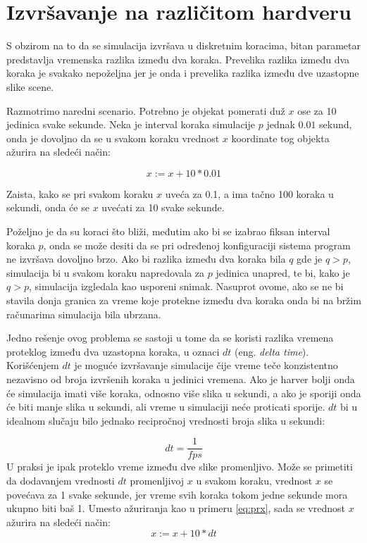 \documentclass[12pt,oneside]{memoir}
\newtheorem{primer}{Primer}[section]
\begin{document}
\section{Izvršavanje na različitom hardveru}

S obzirom na to da se simulacija izvršava u diskretnim koracima,
bitan parametar predstavlja vremenska razlika između dva koraka.
Prevelika razlika između dva koraka je svakako nepoželjna jer je onda i prevelika razlika između dve uzastopne slike scene.

Razmotrimo naredni scenario. Potrebno je objekat pomerati duž $x$ ose za 10 jedinica svake sekunde. Neka je interval koraka simulacije 
$p$ jednak $0.01$ sekund, onda je dovoljno da se u svakom koraku vrednost $x$ koordinate tog objekta ažurira na sledeći način:


\begin{equation}
	x:= x + 10 * 0.01
	\label{eq:prx}
\end{equation}

Zaista, kako se pri svakom koraku $x$ uveća za 0.1, a ima tačno 100 koraka u sekundi, onda će se $x$ uvećati za 10 svake sekunde.

Poželjno je da su koraci što bliži, međutim ako bi se izabrao fiksan interval koraka $p$, onda se može desiti
da se pri određenoj konfiguraciji sistema program ne izvršava dovoljno brzo. 
Ako bi razlika između dva koraka bila $q$ gde je $q > p$, 
simulacija bi u svakom koraku napredovala za $p$ jedinica unapred, te bi,
kako je $q > p$, simulacija izgledala kao usporeni snimak.
Nasuprot ovome, ako se ne bi stavila donja granica za vreme koje protekne između dva koraka onda bi na bržim računarima
simulacija bila ubrzana. 

Jedno rešenje ovog problema se sastoji u tome da se koristi 
razlika vremena proteklog između dva uzastopna koraka, u oznaci $dt$ (eng. {\em delta time}).
Korišćenjem $dt$ je moguće izvršavanje simulacije čije vreme teče konzistentno nezavisno od broja izvršenih koraka u 
jedinici vremena. Ako je harver bolji onda će simulacija imati više koraka, odnosno više slika u sekundi, a ako je 
sporiji onda će biti manje slika u sekundi, ali vreme u simulaciji neće proticati sporije.
$dt$ bi u idealnom slučaju bilo jednako recipročnoj vrednosti broja slika u sekundi:


$$dt = \frac{1}{fps}$$
U praksi je ipak proteklo vreme između dve slike promenljivo.
Može se primetiti da dodavanjem vrednosti $dt$ promenljivoj $x$ u svakom koraku, vrednost $x$ se povećava 
za 1 svake sekunde, jer vreme svih koraka tokom jedne sekunde mora ukupno biti baš 1.
Umesto ažuriranja kao u primeru \ref{eq:prx}, sada se vrednost $x$ ažurira na sledeći način:
\begin{equation}
	\label{eq:prx}
	x:= x + 10 * dt
\end{equation}
\end{document}
